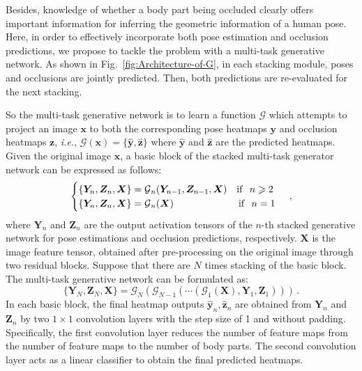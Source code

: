 \documentclass[10pt,journal,compsoc]{IEEEtran}
\begin{document}
Besides, knowledge of whether a body part being occluded clearly offers important information for inferring the geometric information of a human pose.
Here, in order to effectively incorporate both pose estimation and occlusion predictions, we propose to tackle the problem with a multi-task generative network.
As shown in Fig.~\ref{fig:Architecture-of-G}, in each stacking module, poses and occlusions are jointly predicted. Then, both predictions are re-evaluated for the next stacking.








\def\x{ { \bm x } }






So the multi-task generative network is to learn a function $\mathcal{G}$ which attempts to project an image $\bm{x}$ to both the corresponding pose heatmaps $\bm{y}$ and occlusion heatmaps $\bm{z}$, \emph{i.e.}, $\mathcal{G}(\x) =  \{\hat{\bm{y}}, \hat{\bm{z}}\}$ where $\hat{\bm{y}}$ and $\hat{\bm{z}}$ are the predicted heatmaps.
Given the original image $\bm{x}$, a basic block of the stacked multi-task generator network can be expressed as follows:
\begin{equation}
\nonumber
\begin{cases}
\{\bm{Y}_{n},\bm{Z}_{n},\bm{X}\}=\mathcal{G}{}_{n}(\bm{Y}_{n-1},\bm{Z}_{n-1},\bm{X})  \quad{\rm if~~}n\geqslant2\\
\{\bm{Y}_{n},\bm{Z}_{n},\bm{X}\}=\mathcal{G}{}_{n}(\bm{X})\quad\quad\quad\quad\quad\quad~~ {\rm if~~} n=1
\end{cases}
\,,
\end{equation}
where $\bm{Y}_{n}$ and $\bm{Z}_{n}$ are the output activation tensors of the $n\textrm{-th}$ stacked generative network for pose estimations and occlusion predictions, respectively.
$\bm{X}$ is the image feature tensor, obtained after pre-processing on the original image through two residual blocks.
Suppose that there are $N$ times stacking of the basic block. The multi-task generative network can be formulated as:
\begin{equation}
\nonumber
\{\bm{Y}_{N},\bm{Z}_{N},\bm{X}\}=\mathcal{G}_{N}(\mathcal{G}_{N-1}(\cdots(\mathcal{G}_{1}(\bm{X}),\bm{Y}_{1},\bm{Z}_{1}))) \,.
\end{equation}
In each basic block, the final heatmap outputs $\hat{\bm{y}}_{n},\hat{\bm{z}}_{n}$ are obtained from $\bm{Y}_{n}$ and $\bm{Z}_{n}$ by two $1\times 1$ convolution layers with the step size of 1 and without padding. Specifically, the first convolution layer reduces the number of feature maps from the number of feature maps to the number of body parts. The second convolution layer acts as a linear classifier to obtain the final predicted heatmaps.
\end{document}

